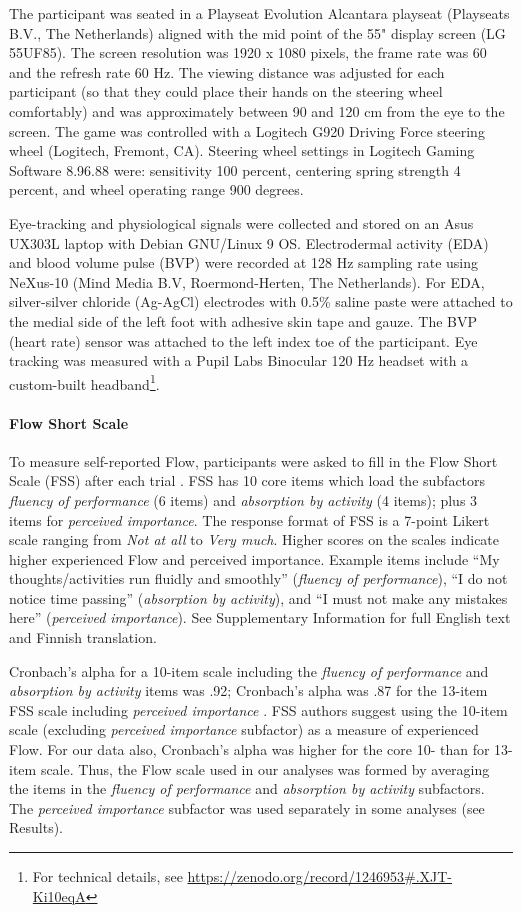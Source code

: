 \documentclass{frontierstyle/frontiersSCNS}
\newcommand{\hl}{\textcolor{red!80}}
\begin{document}
The participant was seated in a Playseat Evolution Alcantara playseat (Playseats B.V., The Netherlands) aligned with the mid point of the 55" display screen (LG 55UF85). The screen resolution was 1920 x 1080 pixels, the frame rate was 60 and the refresh rate 60 Hz. The viewing distance was adjusted for each participant (so that they could place their hands on the steering wheel comfortably) and was approximately between 90 and 120 cm from the eye to the screen. The game was controlled with a Logitech G920 Driving Force steering wheel (Logitech, Fremont, CA). Steering wheel settings in Logitech Gaming Software 8.96.88 were: sensitivity 100 percent, centering spring strength 4 percent, and wheel operating range 900 degrees.

Eye-tracking and physiological signals were collected and stored on an Asus UX303L laptop with Debian GNU/Linux 9 OS. \hl{Electrodermal activity (EDA) and blood volume pulse (BVP) were recorded at 128 Hz sampling rate using NeXus-10 (Mind Media B.V, Roermond-Herten, The Netherlands). For EDA, silver-silver chloride (Ag-AgCl) electrodes with 0.5\% saline paste were attached to the medial side of the left foot with adhesive skin tape and gauze. The BVP (heart rate) sensor was attached to the left index toe of the participant. Eye tracking was measured with a Pupil Labs Binocular 120 Hz headset with a custom-built headband}\footnote{For technical details, see \url{https://zenodo.org/record/1246953\#.XJT-Ki10eqA}}.


\paragraph*{Flow Short Scale} To measure self-reported Flow, participants were asked to fill in the Flow Short Scale (FSS) after each trial \citep{Rheinberg2003,Engeser2008}. FSS has 10 core items which load the subfactors {\it fluency of performance} (6 items) and {\it absorption by activity} (4 items); plus 3 items for {\it perceived importance}. The response format of FSS is a 7-point Likert scale ranging from {\it Not at all} to {\it Very much}. Higher scores on the scales indicate higher experienced Flow and perceived importance. Example items include ``My thoughts/activities run fluidly and smoothly'' ({\it fluency of performance}), ``I do not notice time passing'' ({\it absorption by activity}), and ``I must not make any mistakes here'' ({\it perceived importance}). See Supplementary Information for full English text and Finnish translation.

Cronbach's alpha for a 10-item scale including the {\it fluency of performance} and {\it absorption by activity} items was .92; Cronbach's alpha was .87 for the 13-item FSS scale including {\it perceived importance} \citep{Rheinberg2003}. FSS authors \citep{Rheinberg2003} suggest using the 10-item scale (excluding {\it perceived importance} subfactor) as a measure of experienced Flow. For our data also, Cronbach's alpha was higher for the core 10- than for 13-item scale. Thus, the Flow scale used in our analyses was formed by averaging the items in the {\it fluency of performance} and {\it absorption by activity} subfactors. The {\it perceived importance} subfactor was used separately in some analyses (see Results).
\end{document}

